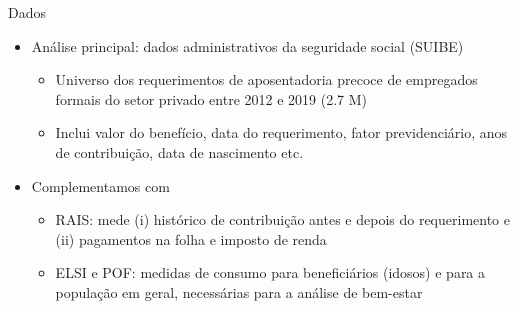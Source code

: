 \begin{frame}{Dados}
    \begin{itemize}
        \item Análise principal: dados administrativos da seguridade social (SUIBE)
        \begin{itemize}
            \item Universo dos requerimentos de aposentadoria precoce de empregados formais do setor privado entre 2012 e 2019 (2.7 M)
            \item Inclui valor do benefício, data do requerimento, fator previdenciário, anos de contribuição, data de nascimento etc.
        \end{itemize}
        \item Complementamos com
        \begin{itemize}
            \item RAIS: mede (i) histórico de contribuição antes e depois do requerimento e (ii) pagamentos na folha e imposto de renda
            \item ELSI e POF: medidas de consumo para beneficiários (idosos) e para a população em geral, necessárias para a análise de bem-estar
        \end{itemize}
    \end{itemize}
\end{frame}

